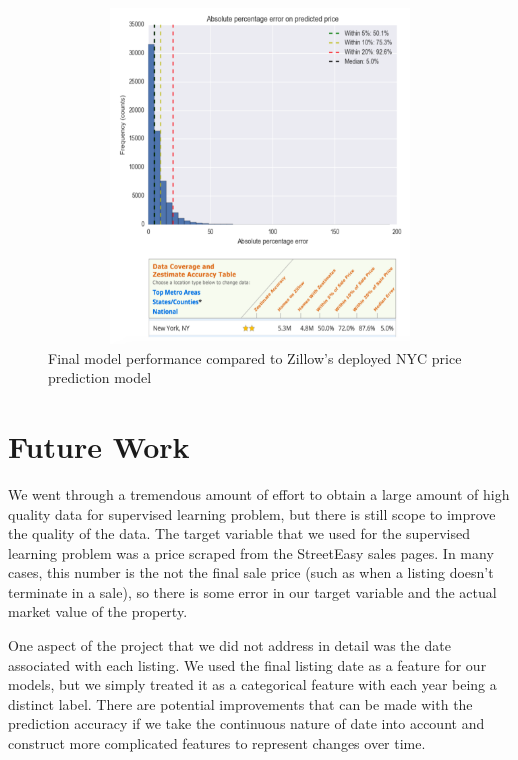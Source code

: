 \documentclass[journal]{IEEEtran}
\begin{document}

\begin{figure}
    \centering
    \includegraphics[width=5in,height=3.5in,clip,keepaspectratio]{hist_zillow.png}
    \caption{Final model performance compared to Zillow's deployed NYC price prediction model}
    \label{fig:hist_zillow}
\end{figure}

\section{Future Work}

We went through a tremendous amount of effort to obtain a large amount of high quality data for supervised learning problem, but there is still scope to improve the quality of the data. The target variable that we used for the supervised learning problem was a price scraped from the StreetEasy sales pages. In many cases, this number is the not the final sale price (such as when a listing doesn't terminate in a sale), so there is some error in our target variable and the actual market value of the property.

One aspect of the project that we did not address in detail was the date associated with each listing. We used the final listing date as a feature for our models, but we simply treated it as a categorical feature with each year being a distinct label. There are potential improvements that can be made with the prediction accuracy if we take the continuous nature of date into account and construct more complicated features to represent changes over time.
\end{document}
